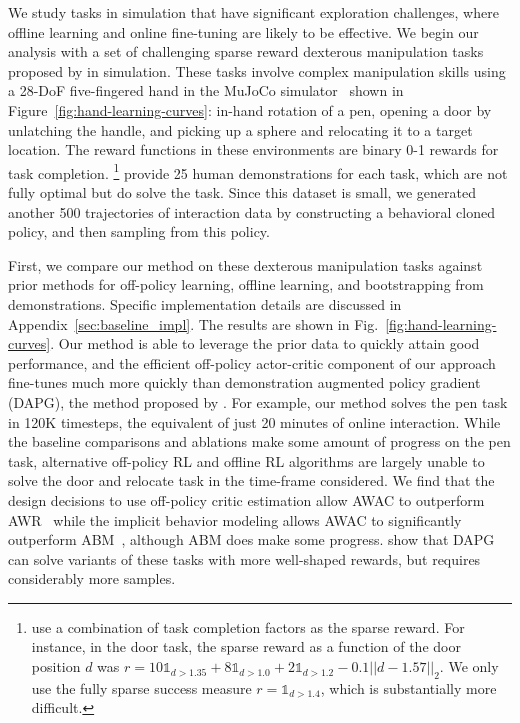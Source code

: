 \documentclass[conference]{IEEEtran}
\begin{document}
We study tasks in simulation that have significant exploration challenges, where offline learning and online fine-tuning are likely to be effective. We begin our analysis with a set of challenging sparse reward dexterous manipulation tasks proposed by \citet{rajeswaran2018dextrous} in simulation.
These tasks involve complex manipulation skills using a 28-DoF five-fingered hand in the MuJoCo simulator~\citep{todorov12mujoco} shown in Figure~\ref{fig:hand-learning-curves}: in-hand rotation of a pen, opening a door by unlatching the handle, and picking up a sphere and relocating it to a target location.
The reward functions in these environments are binary 0-1 rewards for task completion. 
\footnote{\citet{rajeswaran2018dextrous} use a combination of task completion factors as the sparse reward. For instance, in the door task, the sparse reward as a function of the door position $d$ was $r = 10\mathds{1}_{d > 1.35} + 8\mathds{1}_{d > 1.0} + 2\mathds{1}_{d > 1.2} - 0.1||d - 1.57||_2$. We only use the fully sparse success measure $r = \mathds{1}_{d > 1.4}$, which is substantially more difficult. } 
\citet{rajeswaran2018dextrous} provide 25 human demonstrations for each task, which are not fully optimal but do solve the task. Since this dataset is small, we generated another 500 trajectories of interaction data by constructing a behavioral cloned policy, and then sampling from this policy.



First, we compare our method on these dexterous manipulation tasks against prior methods for off-policy learning, offline learning, and bootstrapping from demonstrations.
Specific implementation details are discussed in Appendix~\ref{sec:baseline_impl}.
The results are shown in Fig.~\ref{fig:hand-learning-curves}. Our method is able to leverage the prior data to quickly attain good performance, and the efficient off-policy actor-critic component of our approach fine-tunes much more quickly than demonstration augmented policy gradient (DAPG), the method proposed by \citet{rajeswaran2018dextrous}. For example, our method solves the pen task in 120K timesteps, the equivalent of just 20 minutes of online interaction. While the baseline comparisons and ablations make some amount of progress on the pen task, alternative off-policy RL and offline RL algorithms are largely unable to solve the door and relocate task in the time-frame considered. We find that the design decisions to use off-policy critic estimation allow AWAC to outperform AWR~\citep{peng2019awr} while the implicit behavior modeling allows AWAC to significantly outperform ABM~\citep{siegel2020abm}, although ABM does make some progress. \citet{rajeswaran2018dextrous} show that DAPG can solve variants of these tasks with more well-shaped rewards, but requires considerably more samples.
\end{document}
